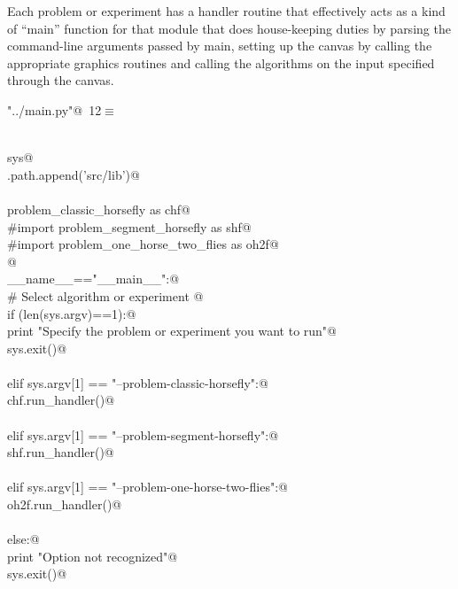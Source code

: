 \documentclass[11.5pt]{report}
\begin{document}
Each problem or experiment has a handler routine 
that effectively acts as a kind of ``main'' function for that module that 
does house-keeping duties by parsing the command-line arguments passed by main, 
setting up the canvas by calling the appropriate graphics routines and calling 
the algorithms on the input specified through the canvas. 

\begin{flushleft} \small
\begin{minipage}{\linewidth}\label{scrap1}\raggedright\small
{} \verb@"../main.py"@\nobreak\ {\footnotesize {12}}$\equiv$
\vspace{-1ex}
\begin{list}{}{} \item
\mbox{}\verb@@\\
\mbox{}\verb@import sys@\\
\mbox{}\verb@sys.path.append('src/lib')@\\
\mbox{}\verb@@\\
\mbox{}\verb@import problem_classic_horsefly as chf@\\
\mbox{}\verb@#import problem_segment_horsefly as shf@\\
\mbox{}\verb@#import problem_one_horse_two_flies as oh2f@\\
\mbox{}\verb@   @\\
\mbox{}\verb@if __name__=="__main__":@\\
\mbox{}\verb@     # Select algorithm or experiment @\\
\mbox{}\verb@     if (len(sys.argv)==1):@\\
\mbox{}\verb@          print "Specify the problem or experiment you want to run"@\\
\mbox{}\verb@          sys.exit()@\\
\mbox{}\verb@@\\
\mbox{}\verb@     elif sys.argv[1] == "--problem-classic-horsefly":@\\
\mbox{}\verb@          chf.run_handler()@\\
\mbox{}\verb@@\\
\mbox{}\verb@     elif sys.argv[1] == "--problem-segment-horsefly":@\\
\mbox{}\verb@          shf.run_handler()@\\
\mbox{}\verb@@\\
\mbox{}\verb@     elif sys.argv[1] == "--problem-one-horse-two-flies":@\\
\mbox{}\verb@          oh2f.run_handler()@\\
\mbox{}\verb@@\\
\mbox{}\verb@     else:@\\
\mbox{}\verb@          print "Option not recognized"@\\
\mbox{}\verb@          sys.exit()@\\
\mbox{}\verb@@{\NWsep}
\end{list}
\vspace{-1.5ex}
\footnotesize
\begin{list}{}{\setlength{\itemsep}{-\parsep}\setlength{\itemindent}{-\leftmargin}}


\end{list}
\end{minipage}
\end{flushleft}
\end{document}

